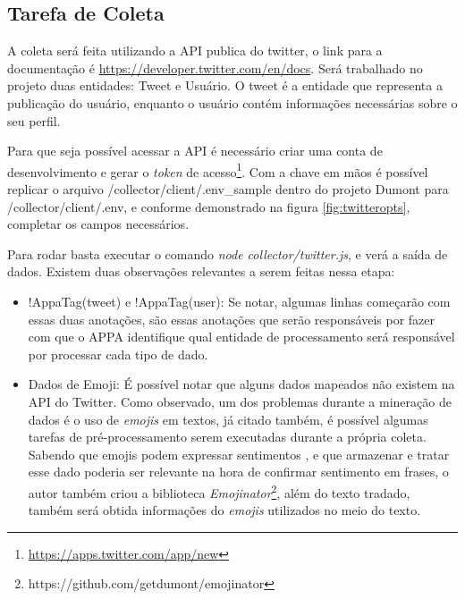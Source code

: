 \subsection{Tarefa de Coleta}
A coleta será feita utilizando a API publica do twitter, o link para a documentação é \url{https://developer.twitter.com/en/docs}. Será trabalhado no projeto duas entidades: Tweet e Usuário. O tweet é a entidade que representa a publicação do usuário, enquanto o usuário contém informações necessárias sobre o seu perfil.

Para que seja possível acessar a API é necessário criar uma conta de desenvolvimento e gerar o \textit{token} de acesso\footnote{\url{https://apps.twitter.com/app/new}}. Com a chave em mãos é possível replicar o arquivo /collector/client/.env\_sample dentro do projeto Dumont para /collector/client/.env, e conforme demonstrado na figura \ref{fig:twitteropts}, completar os campos necessários.

Para rodar basta executar o comando \textit{node collector/twitter.js}, e verá a saída de dados. Existem duas observações relevantes a serem feitas nessa etapa:
\begin{itemize}
  \item !AppaTag(tweet) e !AppaTag(user): Se notar, algumas linhas começarão com essas duas anotações, são essas anotações que serão responsáveis por fazer com que o APPA identifique qual entidade de processamento será responsável por processar cada tipo de dado.
  \item Dados de Emoji: É possível notar que alguns dados mapeados não existem na API do Twitter. Como observado, um dos problemas durante a mineração de dados é o uso de \textit{emojis} em textos, já citado também, é possível algumas tarefas de pré-processamento serem executadas durante a própria coleta. Sabendo que emojis podem expressar sentimentos \cite{novak2015sentiment}, e que armazenar e tratar esse dado poderia ser relevante na hora de confirmar sentimento em frases, o autor também criou a biblioteca \textit{Emojinator}\footnote{https://github.com/getdumont/emojinator}, além do texto tradado, também será obtida informações do \textit{emojis} utilizados no meio do texto.
\end{itemize}

